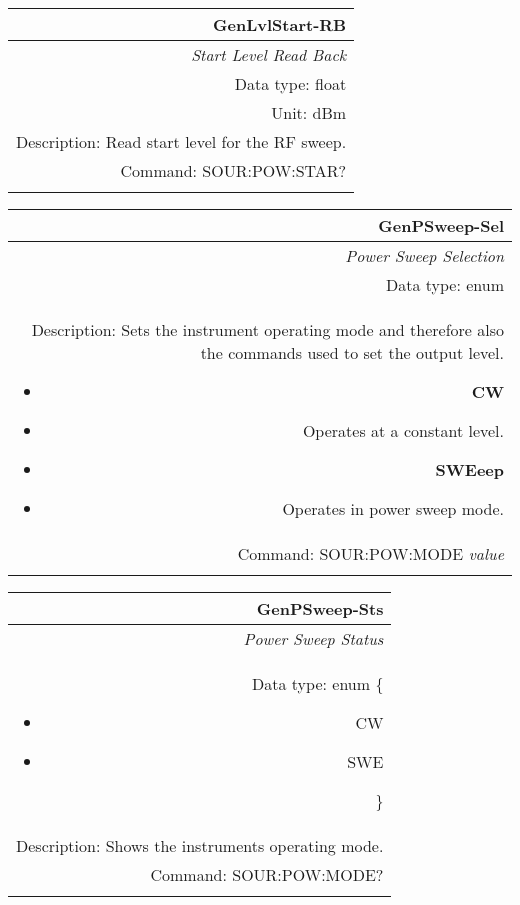 \documentclass[openany]{article}
\begin{document}
		\begin{tabular}{N}
			\hline
			\bfseries GenLvlStart-RB \\ \hline
			\emph{Start Level Read Back} \\
			Data type: float \\
			Unit: dBm \\
			Description: Read start level for the RF sweep. \\
			Command: SOUR:POW:STAR? \\
			\\

		\end{tabular}

		
		\begin{tabular}{N}
			\hline
			\bfseries GenPSweep-Sel \\ \hline
			\emph{Power Sweep Selection} \\
			Data type: enum \\
			Description: Sets the instrument operating mode and therefore also the commands used to set the output level. \begin{itemize}[noitemsep]
				\item[] \textbf{CW} 
				\item[] Operates at a constant level.
				\item[] \textbf{SWEeep}
				\item[] Operates in power sweep mode.
			\end{itemize} \\
			Command: SOUR:POW:MODE \emph{value} \\
			\\

		\end{tabular}


		\begin{tabular}{N}
			\hline
			\bfseries GenPSweep-Sts \\ \hline
			\emph{Power Sweep Status} \\
			Data type: enum \{\begin{itemize}[noitemsep]
				\small
				\item[] CW
				\item[] SWE
			\end{itemize}\} \\
			Description: Shows the instruments operating mode.\\
			Command: SOUR:POW:MODE? \\
			\\

		\end{tabular}
\end{document}
